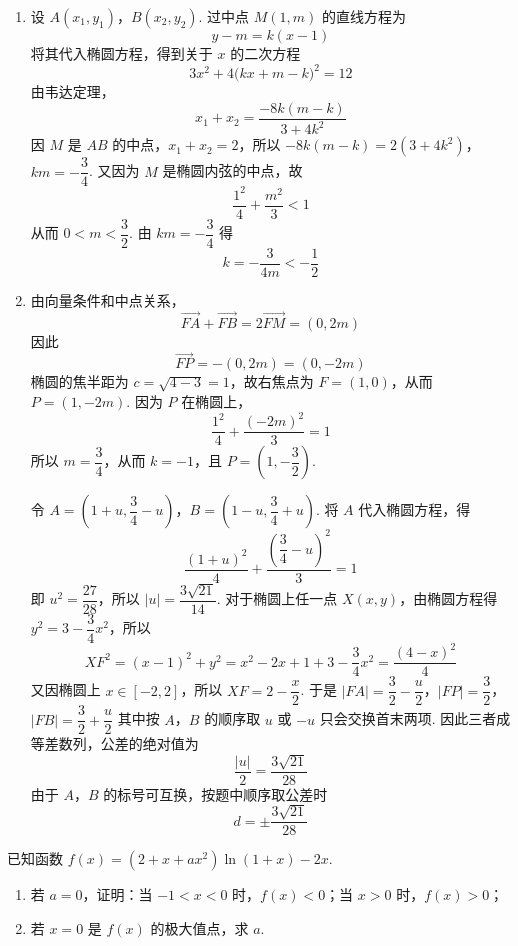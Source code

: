 \begin{solution}
\begin{enumerate}
\item 设 \(A(x_1,y_1)\)，\(B(x_2,y_2)\). 过中点 \(M(1,m)\) 的直线方程为
\[
y-m=k(x-1)
\]
将其代入椭圆方程，得到关于 \(x\) 的二次方程
\[
3x^2+4\bigl(kx+m-k\bigr)^2=12
\]
由韦达定理，
\[
x_1+x_2=\dfrac{-8k(m-k)}{3+4k^2}
\]
因 \(M\) 是 \(AB\) 的中点，\(x_1+x_2=2\)，所以
\(-8k(m-k)=2(3+4k^2)\)，\(km=-\dfrac34\).
又因为 \(M\) 是椭圆内弦的中点，故
\[
\dfrac{1^2}{4}+\dfrac{m^2}{3}<1
\]
从而 \(0<m<\dfrac32\). 由 \(km=-\dfrac34\) 得
\[
k=-\dfrac{3}{4m}< -\dfrac12
\]
\item 由向量条件和中点关系，
\[
\overrightarrow{FA}+\overrightarrow{FB}=2\overrightarrow{FM}=(0,2m)
\]
因此
\[
\overrightarrow{FP}=-(0,2m)=(0,-2m)
\]
椭圆的焦半距为 \(c=\sqrt{4-3}=1\)，故右焦点为 \(F=(1,0)\)，从而 \(P=(1,-2m)\). 因为 \(P\) 在椭圆上，
\[
\dfrac{1^2}{4}+\dfrac{(-2m)^2}{3}=1
\]
所以 \(m=\dfrac34\)，从而 \(k=-1\)，且 \(P=(1,-\dfrac32)\).

令 \(A=(1+u,\dfrac34-u)\)，\(B=(1-u,\dfrac34+u)\). 将 \(A\) 代入椭圆方程，得
\[
\dfrac{(1+u)^2}{4}+\dfrac{(\dfrac34-u)^2}{3}=1
\]
即 \(u^2=\dfrac{27}{28}\)，所以 \(|u|=\dfrac{3\sqrt{21}}{14}\). 对于椭圆上任一点 \(X(x,y)\)，由椭圆方程得 \(y^2=3-\dfrac34x^2\)，所以
\[
XF^2=(x-1)^2+y^2=x^2-2x+1+3-\dfrac34x^2=\dfrac{(4-x)^2}{4}
\]
又因椭圆上 \(x\in[-2,2]\)，所以 \(XF=2-\dfrac x2\). 于是
\(|FA|=\dfrac32-\dfrac u2\)，\(|FP|=\dfrac32\)，\(|FB|=\dfrac32+\dfrac u2\)
其中按 \(A\)，\(B\) 的顺序取 \(u\) 或 \(-u\) 只会交换首末两项. 因此三者成等差数列，公差的绝对值为
\[
\dfrac{|u|}{2}=\dfrac{3\sqrt{21}}{28}
\]
由于 \(A\)，\(B\) 的标号可互换，按题中顺序取公差时
\[
d=\pm\dfrac{3\sqrt{21}}{28}
\]
\end{enumerate}
\end{solution}

\begin{problem}
已知函数 \(f(x)=(2+x+ax^2)\ln(1+x)-2x\).

\begin{enumerate}
\item 若 \(a=0\)，证明：当 \(-1<x<0\) 时，\(f(x)<0\)；当 \(x>0\) 时，\(f(x)>0\)；
\item 若 \(x=0\) 是 \(f(x)\) 的极大值点，求 \(a\).
\end{enumerate}
\end{problem}

